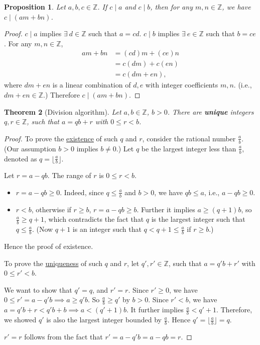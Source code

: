 \documentclass{amsbook}
\theoremstyle{plain}
\newtheorem{theorem}{Theorem}[chapter] %
\newtheorem{proposition}[theorem]{Proposition}
\theoremstyle{definition}
\theoremstyle{remark}
\numberwithin{equation}{chapter}
\numberwithin{figure}{chapter}
\begin{document}
\begin{proposition}\label{prop:div_linear_combi}
Let $a, b, c \in \mathbb{Z}$. If $c \mid a$ and $c \mid b$, then for any $m, n \in \mathbb{Z}$, we have $c \mid (am + bn)$.
\end{proposition}
\begin{proof}
  $c \mid a $ implies $\exists~ d \in \mathbb{Z}$ such that $a = cd$. $c \mid b $ implies $\exists~ e \in \mathbb{Z}$ such that $b = ce$. For any $m, n \in \mathbb{Z}$,
  \begin{align}
    am + bn &= (cd)m + (ce)n \\
            &= c(dm) + c(en) \\
            &= c(dm+en),
  \end{align}
  where $dm+en$ is a linear combination of $d, e$ with integer coefficients $m, n$. (i.e., $dm+en \in \mathbb{Z}$.) Therefore $c \mid (am + bn)$.
\end{proof}

\begin{theorem}[Division algorithm]\label{thm:div_alg} %
Let $a, b \in \mathbb{Z}$, $b > 0$. There are \textbf{unique} integers $q, r \in \mathbb{Z}$, such that $a = qb +r $ with $0 \leqslant r < b$.
\end{theorem}
\begin{proof}
To prove the \underline{existence} of such $q$ and $r$, consider the rational number $\frac{a}b$. (Our assumption $b > 0$ implies $b \neq 0$.) Let $q$ be the largest integer less than $\frac{a}b$, denoted as $q = \lfloor \frac{a}b \rfloor$. 

Let $r = a - qb$. The range of $r$ is $0 \leqslant r < b$. 
\begin{itemize}
\item $r = a - qb \geqslant 0$. Indeed, since $q \leqslant \frac{a}b$ and $b > 0$, we have $qb \leqslant a$, i.e., $ a - qb \geqslant 0$. 
\item $r < b$, otherwise if $r \geqslant b$, $r = a - qb \geqslant b$. Further it implies $a \geqslant (q+1)b$, so $\frac{a}b \geqslant q+1$, which contradicts the fact that $q$ is the largest integer such that $q \leqslant \frac{a}b$. (Now $q + 1$ is an integer such that $q < q+1 \leqslant \frac{a}b$ if $r \geqslant b$.)
\end{itemize}

Hence the proof of existence.

To prove the \underline{uni}q\underline{ueness} of such $q$ and $r$, let $q', r' \in \mathbb{Z}$, such that $a = q'b + r'$ with $0 \leqslant r' <b$. 

We want to show that $q' = q$, and $r' = r$. Since $r' \geqslant 0$, we have $0 \leqslant r' = a - q'b \implies a \geqslant q'b$. So $\frac{a}b \geqslant q'$ by $b > 0$. Since $r' < b$, we have $a = q'b + r < q'b + b \implies a < (q'+1)b$. It further implies $\frac{a}b < q' + 1$. Therefore, we showed $q'$ is also the largest integer bounded by $\frac{a}b$. Hence $q' =\lfloor \frac{a}b \rfloor = q$.

$r' = r$ follows from the fact that $r' = a - q'b = a - qb = r$.
\end{proof}
\end{document}
